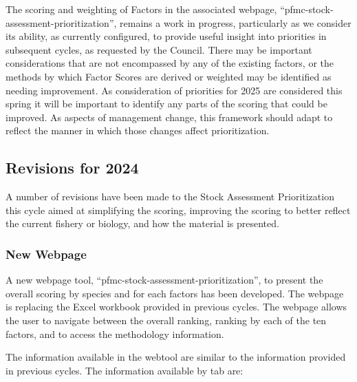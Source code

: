 \documentclass[11pt,
  english,
  a4paper,
]{article}
\begin{document}
The scoring and weighting of Factors in the associated webpage, ``pfmc-stock-assessment-prioritization'', remains a work in progress, particularly as we consider its ability, as currently configured, to provide useful insight into priorities in subsequent cycles, as requested by the Council. There may be important considerations that are not encompassed by any of the existing factors, or the methods by which Factor Scores are derived or weighted may be identified as needing improvement. As consideration of priorities for 2025 are considered this spring it will be important to identify any parts of the scoring that could be improved. As aspects of management change, this framework should adapt to reflect the manner in which those changes affect prioritization.

\hypertarget{revisions-for-2024}{%
\subsection{Revisions for 2024}\label{revisions-for-2024}}

A number of revisions have been made to the Stock Assessment Prioritization this cycle aimed at simplifying the scoring, improving the scoring to better reflect the current fishery or biology, and how the material is presented.

\hypertarget{new-webpage}{%
\subsubsection{New Webpage}\label{new-webpage}}

A new webpage tool, ``pfmc-stock-assessment-prioritization'', to present the overall scoring by species and for each factors has been developed. The webpage is replacing the Excel workbook provided in previous cycles. The webpage allows the user to navigate between the overall ranking, ranking by each of the ten factors, and to access the methodology information.

The information available in the webtool are similar to the information provided in previous cycles. The information available by tab are:
\end{document}
